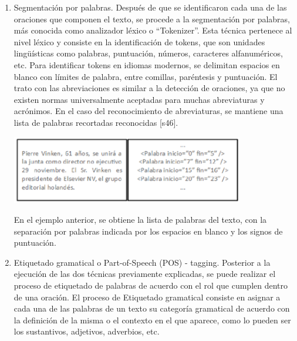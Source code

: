\begin{enumerate}
\item Segmentación por palabras. Después de que se identificaron cada una de las oraciones que componen el texto, se procede a la segmentación por palabras, más conocida como analizador léxico o “Tokenizer”. 
Esta técnica pertenece al nivel léxico y consiste en la identificación de tokens, que son unidades lingüísticas como palabras, puntuación, números, caracteres alfanuméricos, etc. Para identificar tokens en idiomas modernos, se delimitan espacios en blanco con límites de palabra, entre comillas, paréntesis y puntuación.
El trato con las abreviaciones es similar a la detección de oraciones, ya que no existen normas universalmente aceptadas para muchas abreviaturas y acrónimos. En el caso del reconocimiento de abreviaturas, se mantiene una lista de palabras recortadas reconocidas [s46].
\begin{center}
    \includegraphics[width=0.8\textwidth]{Images/lib2.png}
\end{center}
En el ejemplo anterior, se obtiene la lista de palabras del texto, con la separación por palabras indicada por los espacios en blanco y los signos de puntuación. 

\item Etiquetado gramatical o Part-of-Speech (POS) - tagging. Posterior a la ejecución de las dos técnicas previamente explicadas, se puede realizar el proceso de etiquetado de palabras de acuerdo con el rol que cumplen dentro de una oración. El proceso de Etiquetado gramatical consiste en asignar a cada una de las palabras de un texto su categoría gramatical de acuerdo con la definición de la misma o el contexto en el que aparece, como lo pueden ser los sustantivos, adjetivos, adverbios, etc.


\end{enumerate}
